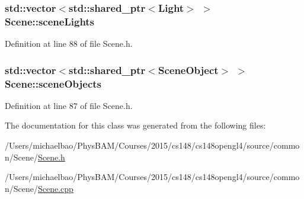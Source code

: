 \subsubsection[{scene\+Lights}]{\setlength{\rightskip}{0pt plus 5cm}std\+::vector$<$std\+::shared\+\_\+ptr$<${\bf Light}$>$ $>$ Scene\+::scene\+Lights\hspace{0.3cm}{\ttfamily [private]}}\label{class_scene_a847f4f9c485a56b084a1340811f0e726}


Definition at line 88 of file Scene.\+h.

\hypertarget{class_scene_a871382922b2a04d7883cf6d34529b5df}{}
\subsubsection[{scene\+Objects}]{\setlength{\rightskip}{0pt plus 5cm}std\+::vector$<$std\+::shared\+\_\+ptr$<${\bf Scene\+Object}$>$ $>$ Scene\+::scene\+Objects\hspace{0.3cm}{\ttfamily [private]}}\label{class_scene_a871382922b2a04d7883cf6d34529b5df}


Definition at line 87 of file Scene.\+h.



The documentation for this class was generated from the following files\+:\begin{DoxyCompactItemize}
\item 
/\+Users/michaelbao/\+Phys\+B\+A\+M/\+Courses/2015/cs148/cs148opengl4/source/common/\+Scene/\hyperlink{_scene_8h}{Scene.\+h}\item 
/\+Users/michaelbao/\+Phys\+B\+A\+M/\+Courses/2015/cs148/cs148opengl4/source/common/\+Scene/\hyperlink{_scene_8cpp}{Scene.\+cpp}\end{DoxyCompactItemize}
